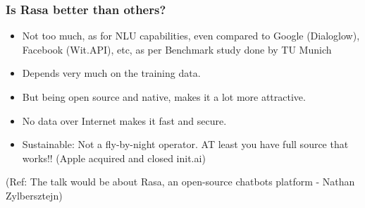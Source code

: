  \begin{frame}[fragile]\frametitle{Is Rasa better than others?}
\begin{itemize}
\item Not too much, as for NLU capabilities, even compared to Google (Dialoglow), Facebook (Wit.API), etc, as per Benchmark study done by TU Munich
\item Depends very much on the training data.
\item But being open source and native, makes it a lot more attractive.
\item No data over Internet makes it fast and secure.
\item Sustainable: Not a fly-by-night operator. AT least you have full source that works!! (Apple acquired and closed init.ai)
\end{itemize}

{\tiny (Ref: The talk would be about Rasa, an open-source chatbots platform - Nathan Zylbersztejn)}

\end{frame}
